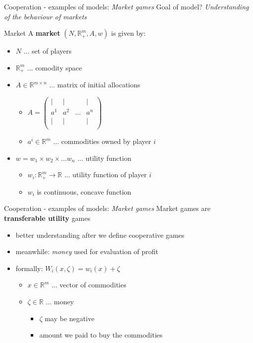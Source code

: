 \documentclass{beamer}
\begin{document}
\begin{frame}{Cooperation - examples of models: \textit{Market games}}
	Goal of model? \textit{Understanding of the behaviour of markets}
	\begin{block}{Market}
	   A \textbf{market} $(N,\mathbb{R}^m_+,A,w)$ is given by:
	\begin{itemize}
		\item<2-> $N$ ... set of players
		\item<3-> $\mathbb{R}^m_+$ ... comodity space
		\item<4-> $A \in \mathbb{R}^{m \times n}$ ... matrix of initial allocations
		\begin{itemize}
		    \item<5-> $A = \begin{pmatrix} \mid & \mid & & \mid \\ a^1 & a^2 & \dots & a^n \\ \mid & \mid &  & \mid \\\end{pmatrix}$
			\item<6-> $a^i \in \mathbb{R}^m$ ... commodities owned by player $i$
		\end{itemize}
			\item<7-> $w = w_1 \times w_2 \times \dots w_n$ ... utility function
		\begin{itemize}
			\item<8-> $w_i \colon \mathbb{R}^m_+ \to \mathbb{R}$ ... utility function of player $i$
			\item<9-> $w_i$ is continuous, concave function
		\end{itemize}
	\end{itemize}
	\end{block}
\end{frame}



\begin{frame}{Cooperation - examples of models: \textit{Market games}}
	Market games are \textbf{transferable utility} games
	\begin{itemize}
		\item<2-> better understanding after we define cooperative games
		\item<2-> meanwhile: \textit{money} used for evaluation of profit
		\item<3-> formally: $W_i(x,\zeta) = w_i(x) + \zeta$
		\begin{itemize}
			\item<4-> $x \in \mathbb{R}^m$ ... vector of commodities
			\item<4-> $\zeta \in \mathbb{R}$ ... money
			\begin{itemize}
                \item<5-> $\zeta$ may be negative
				\item<5-> amount we paid to buy the commodities
			\end{itemize}
		\end{itemize}
	\end{itemize}
\end{frame}
\end{document}
